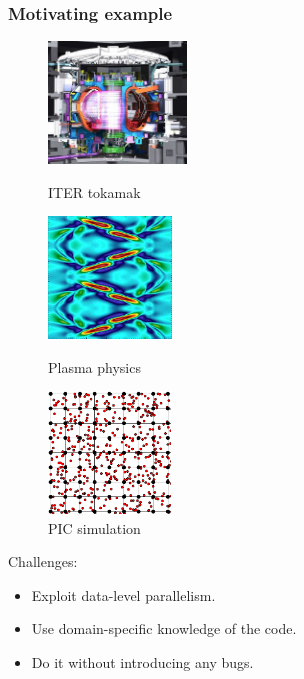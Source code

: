 \begin{frame}[fragile]
\frametitle{Motivating example}

\begin{figure}[H]
\centering
\begin{minipage}{0.275\linewidth}
\centering
\includegraphics[width=\textwidth, height=3.25cm]{images/ITER_tokamak}
\caption{\footnotesize ITER tokamak}
\label{fig:figure1}
\end{minipage}%
\hspace{0.5cm}
\begin{minipage}{0.275\linewidth}
\centering
\includegraphics[width=\textwidth, height=3.25cm]{images/plasma_physics}
\caption{\footnotesize Plasma physics}
\label{fig:figure2}
\end{minipage}%
\hspace{0.5cm}
\begin{minipage}{0.275\linewidth}
\centering
\includegraphics[width=\textwidth, height=3.25cm]{images/PIC_simulation}
\caption{\footnotesize PIC simulation}
\label{fig:figure2}
\end{minipage}
\end{figure}

\bigskip

Challenges:
\begin{itemize}
	\item Exploit data-level parallelism.
	\item Use domain-specific knowledge of the code.
	\item Do it without introducing any bugs.
\end{itemize}

\end{frame}


